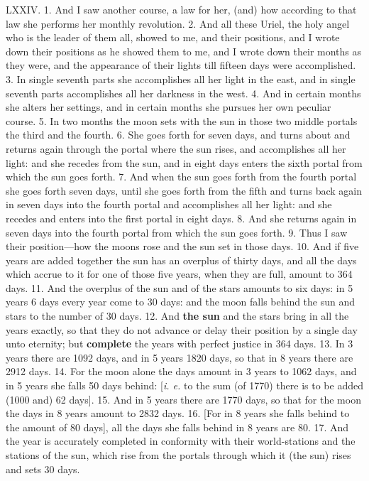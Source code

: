 
LXXIV. 1. And I saw another course, a law for
her, (and) how according to that law she performs her
monthly revolution. 2. And all these Uriel, the holy
angel who is the leader of them all, showed to me, and
their positions, and I wrote down their positions as
he showed them to me, and I wrote down their
months as they were, and the appearance of their
lights till fifteen days were accomplished. 3. In
single seventh parts she accomplishes all her light in
the east, and in single seventh parts accomplishes
all her darkness in the west. 4. And in certain months
she alters her settings, and in certain months she
pursues her own peculiar course. 5. In two months
the moon sets with the sun in those two middle
portals the third and the fourth. 6. She goes forth
for seven days, and turns about and returns again
through the portal where the sun rises, and accomplishes
all her light: and she recedes from the sun,
and in eight days enters the sixth portal from which
the sun goes forth. 7. And when the sun goes forth
from the fourth portal she goes forth seven days,
until she goes forth from the fifth and turns back
again in seven days into the fourth portal and
accomplishes all her light: and she recedes and
enters into the first portal in eight days. 8. And she
returns again in seven days into the fourth portal
from which the sun goes forth. 9. Thus I saw their
position—how the moons rose and the sun set in
those days. 10. And if five years are added together
the sun has an overplus of thirty days, and all
the days which accrue to it for one of those five years,
when they are full, amount to 364 days. 11. And the
overplus of the sun and of the stars amounts to six
days: in 5 years 6 days every year come to 30 days:
and the moon falls behind the sun and stars to the
number of 30 days. 12. And \textbf{the sun} and the stars
bring in all the years exactly, so that they do not
advance or delay their position by a single day unto
eternity; but \textbf{complete} the years with perfect justice
in 364 days. 13. In 3 years there are 1092 days, and
in 5 years 1820 days, so that in 8 years there are
2912 days. 14. For the moon alone the days amount
in 3 years to 1062 days, and in 5 years she falls
50 days behind: [\emph{i. e.} to the sum (of 1770) there is
to be added (1000 and) 62 days]. 15. And in 5
years there are 1770 days, so that for the moon the
days in 8 years amount to 2832 days. 16. [For in
8 years she falls behind to the amount of 80 days],
all the days she falls behind in 8 years are 80. 17.
And the year is accurately completed in conformity
with their world-stations and the stations of the sun,
which rise from the portals through which it (the sun)
rises and sets 30 days.

